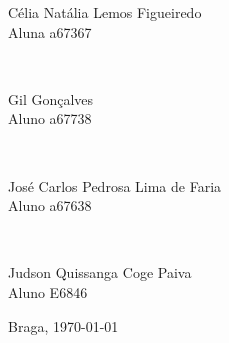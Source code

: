 \begin{titlepage}
\begin{center}
\begin{minipage}{0.4\textwidth}
		\large Célia Natália Lemos Figueiredo\\
           Aluna a67367
\end{minipage}
\\[1cm]
\begin{minipage}{0.4\textwidth}
		\large Gil Gonçalves \\
           Aluno a67738\\
\end{minipage}
\\[1cm]
\begin{minipage}{0.4\textwidth}
		\large José Carlos Pedrosa Lima de Faria\\
		Aluno  a67638
\end{minipage}
\\[1cm]
\begin{minipage}{0.4\textwidth}
	\large Judson Quissanga Coge Paiva\\
	Aluno  E6846
\end{minipage}


\vfill

\large Braga, {\large \today}

\end{center}
\end{titlepage}
